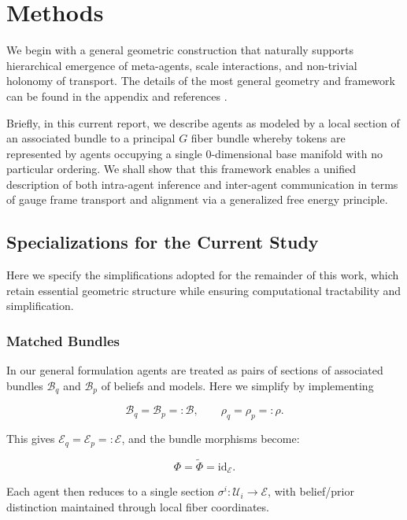 \documentclass[twoside,11pt]{article}
\begin{document}
\section{Methods}

We begin with a general geometric construction that naturally supports hierarchical emergence of meta-agents, scale interactions, and non-trivial holonomy of transport. The details of the most general geometry and framework can be found in the appendix and references \citep{nakahara2003geometry,kullback1951information,sternberg1994group,fulton1991representation,frankel2011geometry,baez1994gauge}.  

Briefly, in this current report, we describe agents as modeled by a local section of an associated bundle to a principal $G$ fiber bundle whereby tokens are represented by agents occupying a single 0-dimensional base manifold with no particular ordering. We shall show that this framework enables a unified description of both intra-agent inference and inter-agent communication in terms of gauge frame transport and alignment via a generalized free energy principle. 


\subsection{Specializations for the Current Study}
Here we specify the simplifications adopted for the remainder of this work, which retain essential geometric structure while ensuring computational tractability and simplification.

\subsubsection{Matched Bundles}
In our general formulation agents are treated as pairs of sections of associated bundles $\mathcal{B}_q$ and $\mathcal{B}_p$ of beliefs and models.  Here we simplify by implementing

\begin{equation}
\mathcal{B}_q = \mathcal{B}_p =: \mathcal{B}, \qquad \rho_q = \rho_p =: \rho.
\end{equation}

This gives $\mathcal{E}_q = \mathcal{E}_p =: \mathcal{E}$, and the bundle morphisms become:

\begin{equation}
\Phi = \tilde{\Phi} = \text{id}_{\mathcal{E}}.
\end{equation}

Each agent then reduces to a single section $\sigma^i: \mathcal{U}_i \to \mathcal{E}$, with belief/prior distinction maintained through local fiber coordinates.
\end{document}
